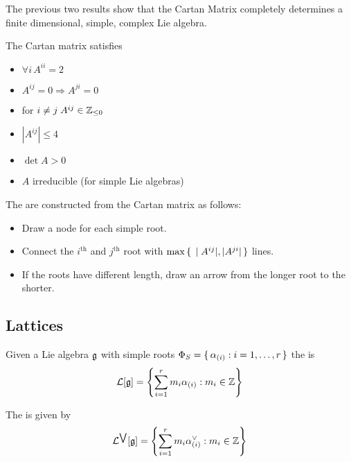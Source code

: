 \documentclass{article}
\begin{document}
\begin{idea}
The previous two results show that the Cartan Matrix completely determines a finite dimensional, simple, complex Lie algebra. 
\end{idea}

\begin{theorem}
The Cartan matrix satisfies
\begin{itemize}
    \item $\forall i \, A^{ii}=2$
    \item $A^{ij}=0 \Rightarrow A^{ji}=0$
    \item for $i \neq j \; A^{ij}\in\mathbb{Z}_{\leq0}$
    \item $|A^{ij}|\leq4$
    \item $\det{A}>0$
    \item $A$ irreducible (for simple Lie algebras)
\end{itemize}
\end{theorem}

\begin{definition}
The  are constructed from the Cartan matrix as follows:
\begin{itemize}
    \item Draw a node for each simple root.
    \item Connect the $i^{\text{th}}$ and $j^\text{th}$ root with $\max\set{  |A^{ij}|, |A^{ji}|  }$ lines. 
    \item If the roots have different length, draw an arrow from the longer root to the shorter. 
\end{itemize}
\end{definition}

\subsection{Lattices}

\begin{definition}
Given a Lie algebra $\mathfrak{g}$ with simple roots $\Phi_S=\set{  \alpha_{(i)} : i=1,\dots,r  }$ the  is 
\[
\mathcal{L} [\mathfrak{g}] = \left\{ \sum_{i=1}^r m_i \alpha_{(i)} : m_i \in\mathbb{Z} \right\}
\]
\end{definition}

\begin{definition}
The  is given by 
\[
\mathcal{L}^{\bigvee} [\mathfrak{g}] =\left\{ \sum_{i=1}^r m_i \alpha^\vee_{(i)} : m_i \in\mathbb{Z} \right\}
\]
\end{definition}
\end{document}
